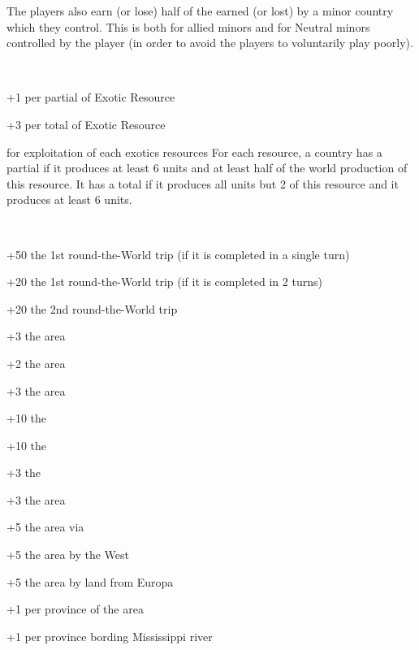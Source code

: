 The players also earn (or lose) half of the \VPs earned (or lost) by a minor
country which they control.
\bparag This is both for allied minors and for Neutral minors controlled by
the player (in order to avoid the players to voluntarily play poorly).

~\\
\begin{modlist}
\item[+1] per partial  of Exotic Resource
\item[+3] per total  of Exotic Resource
\end{modlist}

 for exploitation of each exotics
resources
\bparag \label{chVictories:MonopolyExoticResources} For each resource, a
country has a partial  if it produces at least 6 units and at
least half of the world production of this resource. It has a total
 if it produces all units but 2 of this resource and it
produces at least 6 units.


\aparag[Discoveries]~\\
\begin{modlist}
\item[+50] the 1st round-the-World trip (if it is completed in a single turn)
\item[+20] the 1st round-the-World trip (if it is completed in 2 turns)
\item[+20] the 2nd round-the-World trip
\item[+3] the \granderegionQuebec area
\item[+2] the  area
\item[+3] the \granderegionRocheuses area
\item[+10] the \seazoneHorn
\item[+10] the \seazoneTempetes
\item[+3] the \seazoneHudson
\item[+3] the \granderegionAlaska area
\item[+5] the \granderegionAlaska area via \continentAsia
\item[+5] the \granderegionPanama area by the West
\item[+5] the \granderegionKamchatka area by land from Europa
\item[+1] per province of the \granderegionAmazonia area
\item[+1] per province bording Mississippi river
\end{modlist}

